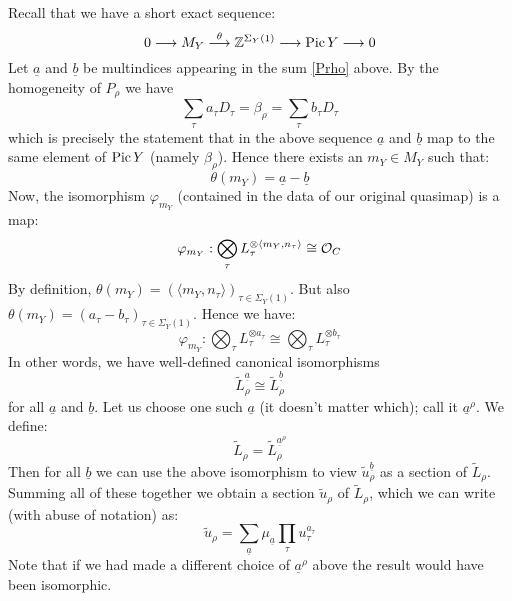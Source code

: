 Recall that we have a short exact sequence:
\begin{equation} \label{Pic short exact sequence for Y} 0 \longrightarrow M_Y \overset{\theta}{\longrightarrow} \mathbb{Z}^{\Sigma_Y(1)} \longrightarrow \operatorname{Pic} Y \longrightarrow 0 \end{equation}
Let $\underline{a}$ and $\underline{b}$ be multindices appearing in the sum \eqref{Prho} above. By the homogeneity of $P_\rho$ we have
\begin{equation*} \sum_\tau a_\tau D_\tau = \beta_\rho = \sum_\tau b_\tau D_\tau \end{equation*}
which is precisely the statement that in the above sequence $\underline{a}$ and $\underline{b}$ map to the same element of $\operatorname{Pic} Y$ (namely $\beta_\rho$). Hence there exists an $m_Y \in M_Y$ such that:
\begin{equation*} \theta(m_Y) = \underline{a} - \underline{b} \end{equation*}
Now, the isomorphism $\varphi_{m_Y}$ (contained in the data of our original quasimap) is a map:
\begin{equation*} \varphi_{m_Y} : \bigotimes_\tau L_\tau^{\otimes \langle m_Y, n_\tau \rangle} \cong \mathcal{O}_C \end{equation*}
By definition, $\theta(m_Y) = (\langle m_Y,n_\tau \rangle)_{\tau \in \Sigma_Y(1)}$. But also $\theta(m_Y) = (a_\tau - b_\tau)_{\tau \in \Sigma_Y(1)}$. Hence we have:
\begin{equation*} \varphi_{m_Y} : \bigotimes_\tau L_\tau^{\otimes a_\tau} \cong \bigotimes_\tau L_\tau^{\otimes b_\tau} \end{equation*}
In other words, we have well-defined canonical isomorphisms
\begin{equation*} \tilde{L}_\rho^{\underline{a}} \cong \tilde{L}_\rho^{\underline{b}} \end{equation*}
for all $\underline{a}$ and $\underline{b}$. Let us choose one such $\underline{a}$ (it doesn't matter which); call it $\underline{a}^\rho$. We define:
\begin{equation*} \tilde{L}_\rho = \tilde{L}_\rho^{\underline{a}^\rho} \end{equation*}
Then for all $\underline{b}$ we can use the above isomorphism to view $\tilde{u}_\rho^{\underline{b}}$ as a section of $\tilde{L}_\rho$. Summing all of these together we obtain a section $\tilde{u}_\rho$ of $\tilde{L}_\rho$, which we can write (with abuse of notation) as:
\begin{equation*} \tilde{u}_\rho = \sum_{\underline{a}} \mu_{\underline{a}} \prod_\tau u_\tau^{a_\tau} \end{equation*}
Note that if we had made a different choice of $\underline{a}^\rho$ above the result would have been isomorphic.


